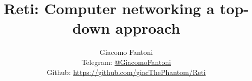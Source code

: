 
\title{\Huge \textbf{Reti: Computer networking a top-down approach}}
\author{
  Giacomo Fantoni \\
  \small Telegram: \href{https://t.me/GiacomoFantoni}{@GiacomoFantoni} \\[3pt]
  \small Github: \href{https://github.com/giacThePhantom/Reti}{https://github.com/giacThePhantom/Reti}}

\maketitle
\tableofcontents








